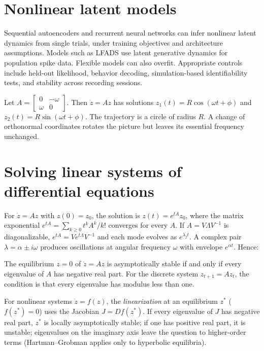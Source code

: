\section{Nonlinear latent models}
Sequential autoencoders and recurrent neural networks can infer nonlinear latent dynamics from single trials, under training objectives and architecture assumptions. Models such as LFADS use latent generative dynamics for population spike data. Flexible models can also overfit. Appropriate controls include held-out likelihood, behavior decoding, simulation-based identifiability tests, and stability across recording sessions.

\begin{workedexample}
Let $A=\begin{bmatrix}0&-\omega\\\omega&0\end{bmatrix}$. Then $\dot z=Az$ has solutions $z_1(t)=R\cos(\omega t+\phi)$ and $z_2(t)=R\sin(\omega t+\phi)$. The trajectory is a circle of radius $R$. A change of orthonormal coordinates rotates the picture but leaves its essential frequency unchanged.
\end{workedexample}
\section{Solving linear systems of differential equations}
For $\dot z=Az$ with $z(0)=z_0$, the solution is $z(t)=e^{tA}z_0$, where the matrix exponential $e^{tA}=\sum_{k\ge0}t^kA^k/k!$ converges for every $A$. If $A=V\Lambda V^{-1}$ is diagonalizable, $e^{tA}=Ve^{t\Lambda}V^{-1}$ and each mode evolves as $e^{\lambda_jt}$. A complex pair $\lambda=\alpha\pm i\omega$ produces oscillations at angular frequency $\omega$ with envelope $e^{\alpha t}$. Hence:
\begin{theorem}
The equilibrium $z=0$ of $\dot z=Az$ is asymptotically stable if and only if every eigenvalue of $A$ has negative real part. For the discrete system $z_{t+1}=Az_t$, the condition is that every eigenvalue has modulus less than one.
\end{theorem}
For nonlinear systems $\dot z=f(z)$, the \emph{linearization} at an equilibrium $z^\ast$ ($f(z^\ast)=0$) uses the Jacobian $J=Df(z^\ast)$. If every eigenvalue of $J$ has negative real part, $z^\ast$ is locally asymptotically stable; if one has positive real part, it is unstable; eigenvalues on the imaginary axis leave the question to higher-order terms (Hartman--Grobman applies only to hyperbolic equilibria).

